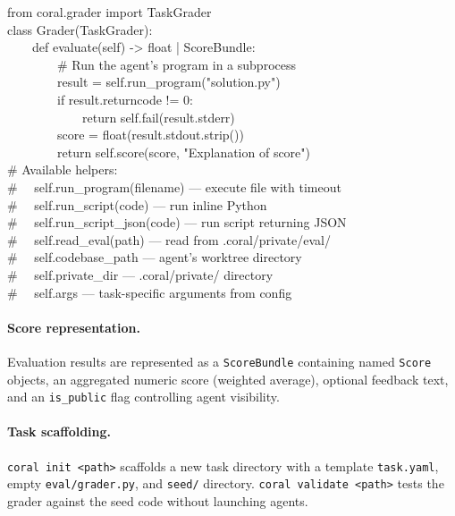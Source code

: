 \begin{promptbox}
\label{box:grader}
\ttfamily\scriptsize
from coral.grader import TaskGrader\\[2pt]
class Grader(TaskGrader):\\
~~~~def evaluate(self) -> float | ScoreBundle:\\
~~~~~~~~\# Run the agent's program in a subprocess\\
~~~~~~~~result = self.run\_program("solution.py")\\
~~~~~~~~if result.returncode != 0:\\
~~~~~~~~~~~~return self.fail(result.stderr)\\
~~~~~~~~score = float(result.stdout.strip())\\
~~~~~~~~return self.score(score, "Explanation of score")\\[4pt]
\# Available helpers:\\
\# ~~self.run\_program(filename) --- execute file with timeout\\
\# ~~self.run\_script(code) --- run inline Python\\
\# ~~self.run\_script\_json(code) --- run script returning JSON\\
\# ~~self.read\_eval(path) --- read from .coral/private/eval/\\
\# ~~self.codebase\_path --- agent's worktree directory\\
\# ~~self.private\_dir --- .coral/private/ directory\\
\# ~~self.args --- task-specific arguments from config
\end{promptbox}

\paragraph{Score representation.} Evaluation results are represented as a \texttt{ScoreBundle} containing named \texttt{Score} objects, an aggregated numeric score (weighted average), optional feedback text, and an \texttt{is\_public} flag controlling agent visibility.

\paragraph{Task scaffolding.} \texttt{coral init <path>} scaffolds a new task directory with a template \texttt{task.yaml}, empty \texttt{eval/grader.py}, and \texttt{seed/} directory. \texttt{coral validate <path>} tests the grader against the seed code without launching agents.

